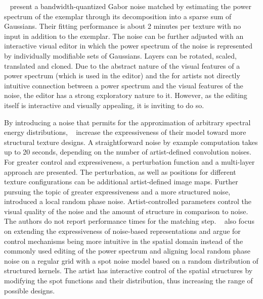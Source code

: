 \citeauthor*{galerne_2012_gne}~\cite{galerne_2012_gne} present a bandwidth-quantized Gabor noise matched by estimating the power spectrum of the exemplar through its decomposition into a sparse sum of Gaussians. Their fitting performance is about 2 minutes per texture with no input in addition to the exemplar. The noise can be further adjusted with an interactive visual editor in which the power spectrum of the noise is represented by individually modifiable sets of Gaussians. Layers can be rotated, scaled, translated and cloned. Due to the abstract nature of the visual features of a power spectrum (which is used in the editor) and the for artists not directly intuitive connection between a power spectrum and the visual features of the noise, the editor has a strong exploratory nature to it. However, as the editing itself is interactive and visually appealing, it is inviting to do so. 

By introducing a noise that permits for the approximation of arbitrary spectral energy distributions, \citeauthor*{gilet_2012_mkn}~\cite{gilet_2012_mkn} increase the expressiveness of their model toward more structural texture designs. A straightforward noise by example computation takes up to 20 seconds, depending on the number of artist-defined convolution noises. For greater control and expressiveness, a perturbation function and a multi-layer approach are presented. The perturbation, as well as positions for different texture configurations can be additional artist-defined image maps. Further pursuing the topic of greater expressiveness and a more structured noise, \citeauthor*{gilet_2014_lrn}~\cite{gilet_2014_lrn} introduced a local random phase noise. Artist-controlled parameters control the visual quality of the noise and the amount of structure in comparison to noise. The authors do not report performance times for the matching step. \citeauthor*{pavie_2016_pts}~\cite{pavie_2016_pts} also focus on extending the expressiveness of noise-based representations and argue for control mechanisms being more intuitive in the spatial domain instead of the commonly used editing of the power spectrum and aligning local random phase noise on a regular grid with a spot noise model based on a random distribution of structured kernels. The artist has interactive control of the spatial structures by modifying the spot functions and their distribution, thus increasing the range of possible designs.

